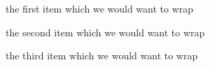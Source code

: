 

\item the first item which we would want to wrap
\item the second item which we would want to wrap
\item the third item which we would want to wrap

